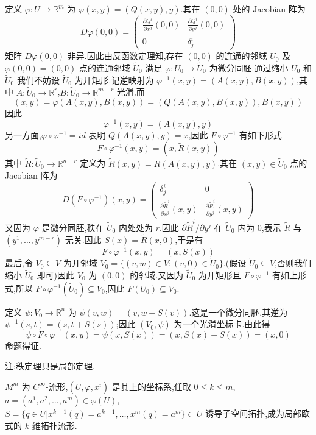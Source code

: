 定义 $\varphi : U \rightarrow \mathbb{R}^m$ 为 $\varphi(x,y) = (Q(x,y),y)$.其在 $(0,0)$ 处的 Jacobian 阵为
\[
D\varphi(0,0) = 
\begin{pmatrix}
\frac{\partial Q^i}{\partial x^j}(0,0) & \frac{\partial Q^i}{\partial y^j}(0,0)\\
0 & \delta_j^i
\end{pmatrix}
\]
矩阵 $D\varphi(0,0)$ 非异.因此由反函数定理知,存在 $(0,0)$ 的连通的邻域 $U_0$ 及 $\varphi(0,0) = (0,0)$ 点的连通邻域 $\tilde{U}_0$ 满足 $\varphi : U_0 \rightarrow \tilde{U}_0$ 为微分同胚.通过缩小 $U_0$ 和 $\tilde{U}_0$ 我们不妨设 $\tilde{U}_0$ 为开矩形.记逆映射为 $\varphi^{-1}(x,y) = (A(x,y),B(x,y))$,其中 $A : \tilde{U}_0 \rightarrow \mathbb{R}^r$,$B : \tilde{U}_0 \rightarrow \mathbb{R}^{m-r}$ 光滑,而
\[
(x,y) = \varphi(A(x,y),B(x,y)) = (Q(A(x,y),B(x,y)),B(x,y))
\]
因此
\[
\varphi^{-1}(x,y) = (A(x,y),y)
\]
另一方面,$\varphi \circ \varphi^{-1} = id$ 表明 $Q(A(x,y),y) = x$,因此 $F \circ \varphi^{-1}$ 有如下形式
\[
F \circ \varphi^{-1}(x,y) = (x,\tilde{R}(x,y))
\]
其中 $\tilde{R} : \tilde{U}_0 \rightarrow \mathbb{R}^{n-r}$ 定义为 $\tilde{R}(x,y) = R(A(x,y),y)$.其在 $(x,y) \in \tilde{U}_0$ 点的 Jacobian 阵为
\[
D(F \circ \varphi^{-1})(x,y) = 
\begin{pmatrix}
\delta_j^i & 0\\
\frac{\partial \tilde{R}^i}{\partial x^j}(x,y) & \frac{\partial \tilde{R}^i}{\partial y^j}(x,y)
\end{pmatrix}
\]
又因为 $\varphi$ 是微分同胚,秩在 $\tilde{U}_0$ 内处处为 $r$.因此 $\partial \tilde{R}^i/\partial y^j$ 在 $\tilde{U}_0$ 内为 0,表示 $\tilde{R}$ 与 $(y^1, \ldots, y^{m-r})$ 无关.因此 $S(x) = \tilde{R}(x,0)$,于是有
\[
F \circ \varphi^{-1}(x,y) = (x,S(x))
\]
最后,令 $V_0 \subseteq V$ 为开邻域 $V_0 = \{(v,w) \in V : (v,0) \in \tilde{U}_0\}$.(假设 $\tilde{U}_0 \subseteq V$,否则我们缩小 $\tilde{U}_0$ 即可)因此 $V_0$ 为 $(0,0)$ 的邻域.又因为 $\tilde{U}_0$ 为开矩形且 $F \circ \varphi^{-1}$ 有如上形式,所以 $F \circ \varphi^{-1}(\tilde{U}_0) \subseteq V_0$,因此 $F(U_0) \subseteq V_0$.

定义 $\psi : V_0 \rightarrow \mathbb{R}^n$ 为 $\psi(v,w) = (v,w - S(v))$.这是一个微分同胚,其逆为 $\psi^{-1}(s,t) = (s,t + S(s))$;因此 $(V_0, \psi)$ 为一个光滑坐标卡.由此得
\[
\psi \circ F \circ \varphi^{-1}(x,y) = \psi(x,S(x)) = (x,S(x) - S(x)) = (x,0)
\]
命题得证.

注:秩定理只是局部定理.

\begin{definition}
$M^m$ 为 $C^\infty$-流形,$(U, \varphi, x^i)$ 是其上的坐标系,任取 $0 \leq k \leq m$,$a = (a^1, a^2, \ldots, a^m) \in \varphi(U)$,$S = \{q \in U | x^{k+1}(q) = a^{k+1}, \ldots, x^m(q) = a^m \} \subset U$ 诱导子空间拓扑,成为局部欧式的 $k$ 维拓扑流形.
\end{definition}

